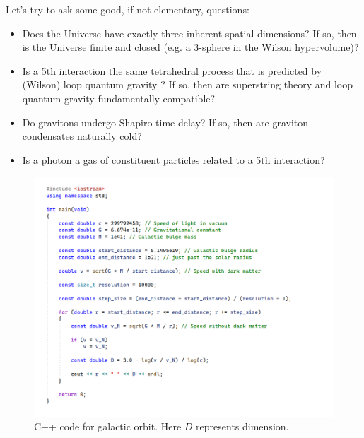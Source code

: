 \documentclass[12pt]{article}
\begin{document}
Let's try to ask some good, if not elementary, questions:
\begin{itemize}
\item Does the Universe have exactly three inherent spatial dimensions?
If so, then is the Universe finite and closed (e.g. a 3-sphere in the Wilson hypervolume)?
\item Is a 5th interaction the same tetrahedral process that is predicted by (Wilson) loop quantum gravity \cite{loop}?
If so, then are superstring theory and loop quantum gravity fundamentally compatible?
\item Do gravitons undergo Shapiro time delay?
If so, then are graviton condensates naturally cold?
\item Is a photon a gas of constituent particles related to a 5th interaction?
\end{itemize}



\pagebreak




\begin{figure} 
\centering
  \includegraphics[width = 8 in]{code.png}
  \caption{ C++ code for galactic orbit. Here $D$ represents dimension.}
\end{figure}




\pagebreak
\end{document}
